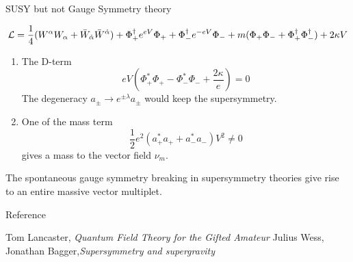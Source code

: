 \documentclass{beamer}
\newcommand{\Lagr}{\mathcal{L}}
\begin{document}
\begin{frame}{SUSY but not Gauge Symmetry theory}
        
    
    \begin{dmath*}
        \Lagr=\frac{1}{4}(W^\alpha W_\alpha+\Bar{W}_{\Dot{\alpha}}\Bar{W}^{\Dot{\alpha}} )+\Phi_+^\dagger e^{eV}\Phi_+ + \Phi_-^\dagger e^{-eV}\Phi_- +m(\Phi_+\Phi_-+\Phi_+^\dagger\Phi_-^\dagger)+2\kappa V
    \end{dmath*}
    
    \begin{enumerate}
        \item The D-term $$eV(\Phi^*_+\Phi_+-\Phi_-^*\Phi_- +\frac{2\kappa}{e})=0$$
        The degeneracy $a_\pm \rightarrow e^{\pm \lambda} a_{\pm} $ would keep the supersymmetry.
        
        \item One of the mass term 
        $$\frac{1}{2}e^2(a_+^*a_+ + a_-^*a_-)V^2 \neq 0 $$
        gives a mass to the vector field $\nu_m$.
    \end{enumerate}
    The spontaneous gauge symmetry breaking in supersymmetry theories give rise to an entire massive vector multiplet.
    
\end{frame}

\begin{frame}{Reference}
    \begin{thebibliography}{}
    Tom Lancaster,
    \textit{Quantum Field Theory for the Gifted Amateur} 
     Julius Wess, Jonathan Bagger,\textit{Supersymmetry and supergravity}  
    \end{thebibliography}
\end{frame}
\end{document}
